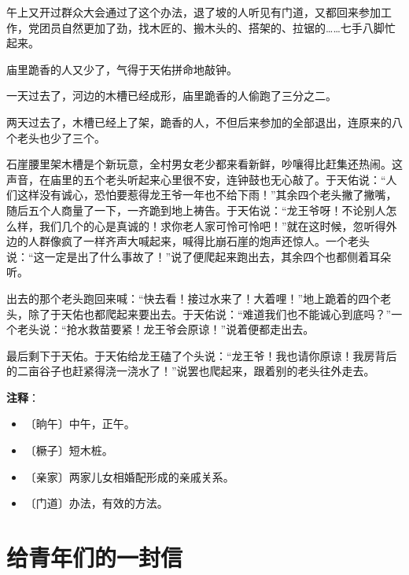 \documentclass[12pt,UTF-8,openany]{ctexbook}
\begin{document}
\begin{large}
    午上又开过群众大会通过了这个办法，退了坡的人听见有门道，又都回来参加工作，党团员自然更加了劲，找木匠的、搬木头的、搭架的、拉锯的……七手八脚忙起来。
    
    庙里跪香的人又少了，气得于天佑拼命地敲钟。
    
    一天过去了，河边的木槽已经成形，庙里跪香的人偷跑了三分之二。
    
    两天过去了，木槽已经上了架，跪香的人，不但后来参加的全部退出，连原来的八个老头也少了三个。
    
    石崖腰里架木槽是个新玩意，全村男女老少都来看新鲜，吵嚷得比赶集还热闹。这声音，在庙里的五个老头听起来心里很不安，连钟鼓也无心敲了。于天佑说：“人们这样没有诚心，恐怕要惹得龙王爷一年也不给下雨！”其余四个老头撇了撇嘴，随后五个人商量了一下，一齐跪到地上祷告。于天佑说：“龙王爷呀！不论别人怎么样，我们几个的心是真诚的！求你老人家可怜可怜吧！”就在这时候，忽听得外边的人群像疯了一样齐声大喊起来，喊得比崩石崖的炮声还惊人。一个老头说：“这一定是出了什么事故了！”说了便爬起来跑出去，其余四个也都侧着耳朵听。
    
    出去的那个老头跑回来喊：“快去看！接过水来了！大着哩！”地上跪着的四个老头，除了于天佑也都爬起来要出去。于天佑说：“难道我们也不能诚心到底吗？”一个老头说：“抢水救苗要紧！龙王爷会原谅！”说着便都走出去。
    
    最后剩下于天佑。于天佑给龙王磕了个头说：“龙王爷！我也请你原谅！我房背后的二亩谷子也赶紧得浇一浇水了！”说罢也爬起来，跟着别的老头往外走去。
    
\end{large}


\newpage

\textbf{注释}：

\vspace{-1em}

\begin{itemize}
    \setlength\itemsep{-0.2em}
    \item 〔晌午〕中午，正午。
    \item 〔橛子〕短木桩。
    \item 〔亲家〕两家儿女相婚配形成的亲戚关系。
    \item 〔门道〕办法，有效的方法。
\end{itemize}

\chapter{给青年们的一封信}
\end{document}
